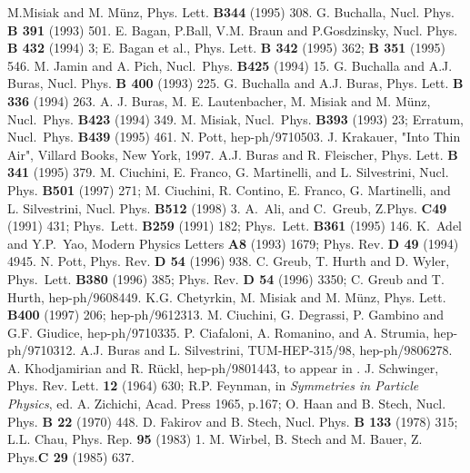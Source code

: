 \begin{thebibliography}{999}
{ M.Misiak and M. M{\"u}nz,}
{ Phys. Lett.} {\bf B344} (1995) 308.
{ G. Buchalla,} { Nucl. Phys.} {\bf B 391} (1993) 501.
{ E. Bagan, P.Ball, V.M. Braun and P.Gosdzinsky,}
{ Nucl. Phys.} {\bf B 432} (1994) 3;
{ E. Bagan} { et al.,} { Phys. Lett.} {\bf B 342} (1995) 362;
{\bf B 351} (1995) 546.
{ M. Jamin and A. Pich,}
{ Nucl.~Phys.} {\bf B425} (1994) 15.
{ G. Buchalla and A.J. Buras,}
{ Nucl. Phys.} {\bf B 400} (1993) 225.
{ G. Buchalla and A.J. Buras,}
{ Phys. Lett.} {\bf B 336} (1994) 263.
{ A. J. Buras, M. E. Lautenbacher, M. Misiak and M. M{\"u}nz,}
{ Nucl.~Phys.} {\bf B423} (1994) 349.
{ M. Misiak,}
{ Nucl.~Phys.} {\bf B393} (1993) 23;
{ Erratum}, { Nucl.~Phys.} {\bf B439} (1995) 461.
N. Pott, hep-ph/9710503.
J. Krakauer, "Into Thin Air", Villard Books, New York, 1997.
A.J. Buras and R. Fleischer, { Phys. Lett.} {\bf B 341} (1995) 379.
M. Ciuchini, E. Franco, G. Martinelli, and  L. Silvestrini,
{ Nucl. Phys.} {\bf B501} (1997) 271;
M. Ciuchini, R. Contino, E. Franco, G. Martinelli, and  L. Silvestrini,
{ Nucl. Phys.} {\bf B512} (1998) 3.
{  A.~Ali, and  C.~Greub,} { Z.Phys.} {\bf C49} (1991) 431;  
{ Phys.~Lett.} {\bf B259} (1991) 182;
{ Phys.~Lett.} {\bf B361} (1995) 146.
 {  K.~Adel and Y.P.~Yao,} 
{ Modern Physics Letters} {\bf A8} (1993) 1679;
{ Phys. Rev.} {\bf D 49} (1994) 4945.
{ N. Pott,} { Phys. Rev.} {\bf D 54} (1996) 938.
{ C. Greub, T. Hurth and D. Wyler,} { Phys.~Lett.} {\bf B380} 
(1996) 385; { Phys. Rev.} {\bf D 54} (1996) 3350; 
{ C. Greub and T. Hurth,} hep-ph/9608449.
{ K.G. Chetyrkin, M. Misiak and M. M{\"u}nz,} 
{ Phys. Lett.} {\bf B400} (1997) 206; hep-ph/9612313. 
M. Ciuchini, G. Degrassi, P. Gambino and G.F. Giudice, 
hep-ph/9710335.
P. Ciafaloni, A. Romanino, and A. Strumia, 
hep-ph/9710312.
A.J. Buras and L. Silvestrini, TUM-HEP-315/98, hep-ph/9806278.
A. Khodjamirian and R. R\"uckl, hep-ph/9801443, to appear in \cite{HFII}.
J. Schwinger, { Phys. Rev. Lett.} {\bf 12} (1964) 630; 
R.P. Feynman, in {\it Symmetries in Particle Physics}, ed. A. Zichichi,
Acad. Press 1965, p.167; O. Haan and B. Stech, 
{ Nucl. Phys.} {\bf B 22}  (1970) 448.  
D. Fakirov and B. Stech, { Nucl. Phys.} {\bf B 133}  (1978) 315;
L.L. Chau, Phys. Rep. {\bf 95} (1983) 1.  
M. Wirbel, B. Stech and M. Bauer, { Z. Phys.}{\bf C 29} (1985) 637.

\end{thebibliography}
